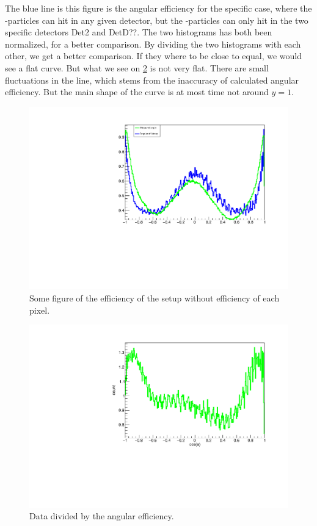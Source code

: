 The blue line is this figure is the angular efficiency for the specific case, where the \al-particles can hit in any given detector, but the \be-particles can only hit in the two specific detectors Det2 and DetD??. The two histograms has both been normalized, for a better comparison. By dividing the two histograms with each other, we get a better comparison. If they where to be close to equal, we would see a flat curve. But what we see on \cref{fig:dataDivEff} is not very flat. 
There are small fluctuations in the line, which stems from the inaccuracy of calculated angular efficiency. But the main shape of the curve is at most time not around $y=1$.

\begin{figure}[h]
	\centering
	\includegraphics[width=\linewidth]{../figures/betaAngles/betaAngle.pdf}
	\caption{Some figure of the efficiency of the setup without efficiency of each pixel. }
	\label{fig:effwithweight}
\end{figure}

\begin{figure}[h]
	\centering
	\includegraphics[width=\linewidth]{../figures/betaAngles/dataDivEff.pdf}
	\caption{Data divided by the angular efficiency. }
	\label{fig:dataDivEff}
\end{figure}

